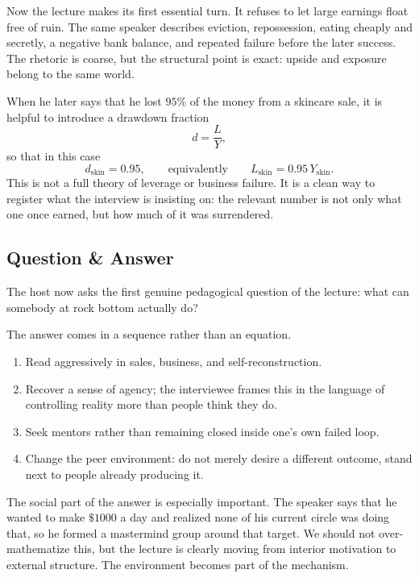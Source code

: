 Now the lecture makes its first essential turn. It refuses to let large earnings float free of ruin. The same speaker describes eviction, repossession, eating cheaply and secretly, a negative bank balance, and repeated failure before the later success. The rhetoric is coarse, but the structural point is exact: upside and exposure belong to the same world.

When he later says that he lost \(95\%\) of the money from a skincare sale, it is helpful to introduce a drawdown fraction
\begin{equation}
d=\frac{L}{Y},
\end{equation}
so that in this case
\begin{equation}
d_{\mathrm{skin}}=0.95,
\qquad\text{equivalently}\qquad
L_{\mathrm{skin}}=0.95\,Y_{\mathrm{skin}}.
\end{equation}
This is not a full theory of leverage or business failure. It is a clean way to register what the interview is insisting on: the relevant number is not only what one once earned, but how much of it was surrendered.

\subsection{Question \& Answer}

The host now asks the first genuine pedagogical question of the lecture: what can somebody at rock bottom actually do?

The answer comes in a sequence rather than an equation.
\begin{enumerate}
\item Read aggressively in sales, business, and self-reconstruction.
\item Recover a sense of agency; the interviewee frames this in the language of controlling reality more than people think they do.
\item Seek mentors rather than remaining closed inside one's own failed loop.
\item Change the peer environment: do not merely desire a different outcome, stand next to people already producing it.
\end{enumerate}

The social part of the answer is especially important. The speaker says that he wanted to make \(\$1000\) a day and realized none of his current circle was doing that, so he formed a mastermind group around that target. We should not over-mathematize this, but the lecture is clearly moving from interior motivation to external structure. The environment becomes part of the mechanism.

